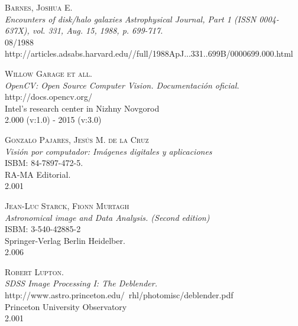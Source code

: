 	\begin{thebibliography}{1}
%
		\textsc{Barnes, Joshua E.} \\
		\textit{Encounters of disk/halo galaxies}
		\textit{Astrophysical Journal, Part 1 (ISSN 0004-637X), vol. 331, Aug. 15, 1988, p. 699-717.}
		\\ 08/1988
		\\http://articles.adsabs.harvard.edu//full/1988ApJ...331..699B/0000699.000.html
		
  		\textsc{Willow Garage et all.} \\
  		\textit{OpenCV: Open Source Computer Vision. Documentación oficial.}
  		\\http://docs.opencv.org/
		\\Intel's research center in Nizhny Novgorod
  		\\2.000 (v:1.0) - 2015 (v:3.0)

  		\textsc{Gonzalo Pajares, Jesús M. de la Cruz} \\
  		\textit{Visión por computador: Imágenes digitales y aplicaciones}
  		\\ISBM: 84-7897-472-5.
  		\\RA-MA Editorial.
  		\\2.001

  		\textsc{Jean-Luc Starck, Fionn Murtagh} \\
  		\textit{Astronomical image and Data Analysis. (Second edition)}
  		\\ISBM: 3-540-42885-2
  		\\Springer-Verlag Berlin Heidelber.
  		\\2.006

	  	\textsc{Robert Lupton.} \\
	  	\textit{SDSS Image Processing I: The Deblender.}
	  	\\http://www.astro.princeton.edu/~rhl/photomisc/deblender.pdf
		\\Princeton University Observatory
	  	\\2.001
	  

\end{thebibliography}
